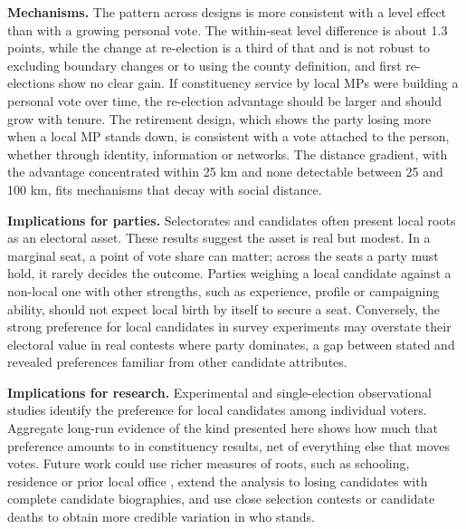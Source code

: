 \documentclass[11pt,a4paper]{article}
\begin{document}
\textbf{Mechanisms.} The pattern across designs is more consistent with a level effect than with a growing personal vote. The within-seat level difference is about 1.3 points, while the change at re-election is a third of that and is not robust to excluding boundary changes or to using the county definition, and first re-elections show no clear gain. If constituency service by local MPs were building a personal vote over time, the re-election advantage should be larger and should grow with tenure. The retirement design, which shows the party losing more when a local MP stands down, is consistent with a vote attached to the person, whether through identity, information or networks. The distance gradient, with the advantage concentrated within 25 km and none detectable between 25 and 100 km, fits mechanisms that decay with social distance.

\textbf{Implications for parties.} Selectorates and candidates often present local roots as an electoral asset. These results suggest the asset is real but modest. In a marginal seat, a point of vote share can matter; across the seats a party must hold, it rarely decides the outcome. Parties weighing a local candidate against a non-local one with other strengths, such as experience, profile or campaigning ability, should not expect local birth by itself to secure a seat. Conversely, the strong preference for local candidates in survey experiments \citep{campbellcowley2014} may overstate their electoral value in real contests where party dominates, a gap between stated and revealed preferences familiar from other candidate attributes.

\textbf{Implications for research.} Experimental and single-election observational studies identify the preference for local candidates among individual voters. Aggregate long-run evidence of the kind presented here shows how much that preference amounts to in constituency results, net of everything else that moves votes. Future work could use richer measures of roots, such as schooling, residence or prior local office \citep{middleton2019}, extend the analysis to losing candidates with complete candidate biographies, and use close selection contests or candidate deaths to obtain more credible variation in who stands.
\end{document}
